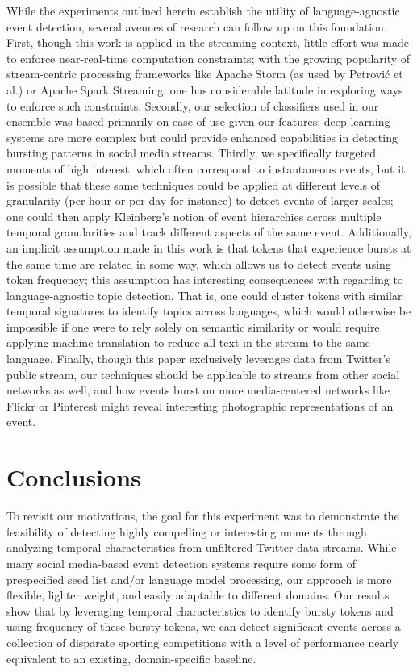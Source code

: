 \documentclass{sig-alternate}
\begin{document}
While the experiments outlined herein establish the utility of language-agnostic event detection, several avenues of research can follow up on this foundation.
First, though this work is applied in the streaming context, little effort was made to enforce near-real-time computation constraints; with the growing popularity of stream-centric processing frameworks like Apache Storm (as used by Petrovi\'{c} et al.) or Apache Spark Streaming, one has considerable latitude in exploring ways to enforce such constraints.
Secondly, our selection of classifiers used in our ensemble was based primarily on ease of use given our features; deep learning systems are more complex but could provide enhanced capabilities in detecting bursting patterns in social media streams.
Thirdly, we specifically targeted moments of high interest, which often correspond to instantaneous events, but it is possible that these same techniques could be applied at different levels of granularity (per hour or per day for instance) to detect events of larger scales; one could then apply Kleinberg's notion of event hierarchies across multiple temporal granularities and track different aspects of the same event.
Additionally, an implicit assumption made in this work is that tokens that experience bursts at the same time are related in some way, which allows us to detect events using token frequency; this assumption has interesting consequences with regarding to language-agnostic topic detection.
That is, one could cluster tokens with similar temporal signatures to identify topics across languages, which would otherwise be impossible if one were to rely solely on semantic similarity or would require applying machine translation to reduce all text in the stream to the same language.
Finally, though this paper exclusively leverages data from Twitter's public stream, our techniques should be applicable to streams from other social networks as well, and how events burst on more media-centered networks like Flickr or Pinterest might reveal interesting photographic representations of an event.

\section{Conclusions}
\label{sect:conlusions}

To revisit our motivations, the goal for this experiment was to demonstrate the feasibility of detecting highly compelling or interesting moments through analyzing temporal characteristics from unfiltered Twitter data streams.
While many social media-based event detection systems require some form of prespecified seed list and/or language model processing, our approach is more flexible, lighter weight, and easily adaptable to different domains.
Our results show that by leveraging temporal characteristics to identify bursty tokens and using frequency of these bursty tokens, we can detect significant events across a collection of disparate sporting competitions with a level of performance nearly equivalent to an existing, domain-specific baseline.
\end{document}
